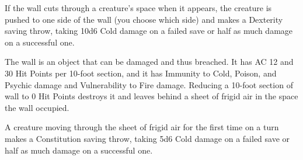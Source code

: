\documentclass[10pt,a4paper,twoside,bg=print,twocolumn,openany,nodeprecatedcode]{dndbook}
\begin{document}
If the wall cuts through a creature's space when it appears, the creature is pushed to one side of the wall (you choose which side) and makes a Dexterity saving throw, taking 10d6 Cold damage on a failed save or half as much damage on a successful one.

The wall is an object that can be damaged and thus breached. It has AC 12 and 30 Hit Points per 10-foot section, and it has Immunity to Cold, Poison, and Psychic damage and Vulnerability to Fire damage. Reducing a 10-foot section of wall to 0 Hit Points destroys it and leaves behind a sheet of frigid air in the space the wall occupied.

A creature moving through the sheet of frigid air for the first time on a turn makes a Constitution saving throw, taking 5d6 Cold damage on a failed save or half as much damage on a successful one.
\end{document}
